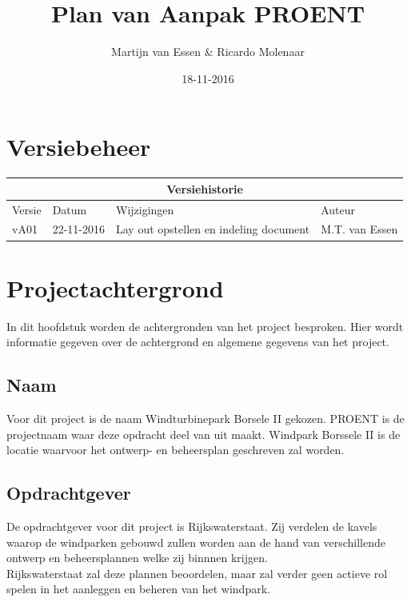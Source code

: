 \documentclass[numbers=endperiod]{scrartcl}
\title{Plan van Aanpak PROENT}
\date{18-11-2016}
\author{Martijn van Essen \& Ricardo Molenaar}
\newcommand{\sectionSmall}[1]{
	\vspace{-10pt}
	\section{#1}
	\vspace{-5pt}
}
\newcommand{\whitespace}{\vspace*{2 mm} \\}%
\begin{document}
	
	\newpage
	
	\setcounter{secnumdepth}{0} %
	\sectionSmall{Versiebeheer}
	
	\begin{center}
		\begin{tabular}{| p{4cm} | l | p{7cm} | l |}
			\hline
			
			\multicolumn{4}{|c|}{
				\cellcolor{hhs_theme_heading_2}
				Versiehistorie
			}  \\ \hline
			
			Versie 	& Datum 		& Wijzigingen 	& Auteur \\ \hline
			vA01 	& 22-11-2016 	& Lay out opstellen en indeling document & M.T. van Essen\\ \hline
		\end{tabular}
	\end{center}
	\newpage
	
	\setcounter{tocdepth}{2}%
	\tableofcontents
	\newpage
	
	\setcounter{secnumdepth}{3}%
	
	\sectionSmall{Projectachtergrond}
	In dit hoofdstuk worden de achtergronden van het project besproken. Hier wordt informatie gegeven over de achtergrond en algemene gegevens van het project.	
	\subsection{Naam}
	Voor dit project is de naam Windturbinepark Borsele II gekozen. PROENT is de projectnaam waar deze opdracht deel van uit maakt. Windpark Borssele II is de locatie waarvoor het ontwerp- en beheersplan geschreven zal worden.
	\subsection{Opdrachtgever}
	De opdrachtgever voor dit project is Rijkswaterstaat. Zij verdelen de kavels waarop de windparken gebouwd zullen worden aan de hand van verschillende ontwerp en beheersplannen welke zij binnnen krijgen.
	\whitespace
	Rijkswaterstaat zal deze plannen beoordelen, maar zal verder geen actieve rol spelen in het aanleggen en beheren van het windpark.
\end{document}

